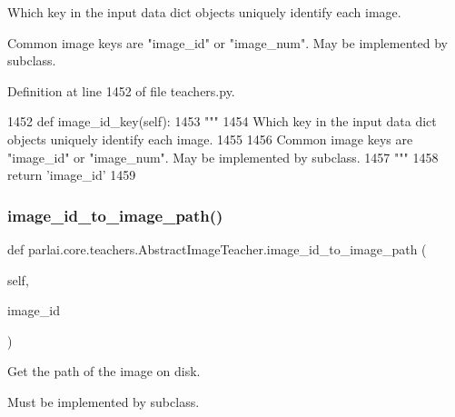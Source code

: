 \begin{DoxyVerb}Which key in the input data dict objects uniquely identify each image.

Common image keys are "image_id" or "image_num". May be implemented by subclass.
\end{DoxyVerb}
 

Definition at line 1452 of file teachers.\+py.


\begin{DoxyCode}
1452     \textcolor{keyword}{def }image\_id\_key(self):
1453         \textcolor{stringliteral}{"""}
1454 \textcolor{stringliteral}{        Which key in the input data dict objects uniquely identify each image.}
1455 \textcolor{stringliteral}{}
1456 \textcolor{stringliteral}{        Common image keys are "image\_id" or "image\_num". May be implemented by subclass.}
1457 \textcolor{stringliteral}{        """}
1458         \textcolor{keywordflow}{return} \textcolor{stringliteral}{'image\_id'}
1459 
\end{DoxyCode}
\mbox{\label{classparlai_1_1core_1_1teachers_1_1AbstractImageTeacher_aa75286450850638274d7f076a81f7e90}} 
\subsubsection{\texorpdfstring{image\+\_\+id\+\_\+to\+\_\+image\+\_\+path()}{image\_id\_to\_image\_path()}}
{\footnotesize\ttfamily def parlai.\+core.\+teachers.\+Abstract\+Image\+Teacher.\+image\+\_\+id\+\_\+to\+\_\+image\+\_\+path (\begin{DoxyParamCaption}\item[{}]{self,  }\item[{}]{image\+\_\+id }\end{DoxyParamCaption})}

\begin{DoxyVerb}Get the path of the image on disk.

Must be implemented by subclass.
\end{DoxyVerb}
 

